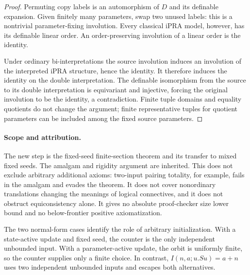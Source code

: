 \begin{proof}
Permuting copy labels is an automorphism of \(D\) and its definable
expansion. Given finitely many parameters, swap two unused labels:
this is a nontrivial parameter-fixing involution. Every classical
iPRA model, however, has its definable linear order. An
order-preserving involution of a linear order is the identity.

Under ordinary bi-interpretations the source involution induces an
involution of the interpreted iPRA structure, hence the identity.
It therefore induces the identity on the double interpretation. The
definable isomorphism from the source to its double interpretation is
equivariant and injective, forcing the original involution to be the
identity, a contradiction. Finite tuple domains and equality quotients
do not change the argument; finite representative tuples for quotient
parameters can be included among the fixed source parameters.
\end{proof}

\paragraph{Scope and attribution.}
The new step is the fixed-seed finite-section theorem and its transfer
to mixed fixed seeds. The amalgam and rigidity argument are inherited.
This does not exclude arbitrary additional axioms: two-input pairing
totality, for example, fails in the amalgam and evades the theorem.
It does not cover nonordinary translations changing the meanings of
logical connectives, and it does not obstruct equiconsistency alone.
It gives no absolute proof-checker size lower bound and no
below-frontier positive axiomatization.

The two normal-form cases identify the role of arbitrary
initialization. With a state-active update and fixed seed, the counter
is the only independent unbounded input. With a parameter-active
update, the orbit is uniformly finite, so the counter supplies only
a finite choice. In contrast,
\(I(n,a;u.Su)=a+n\) uses two independent unbounded inputs and escapes
both alternatives.

